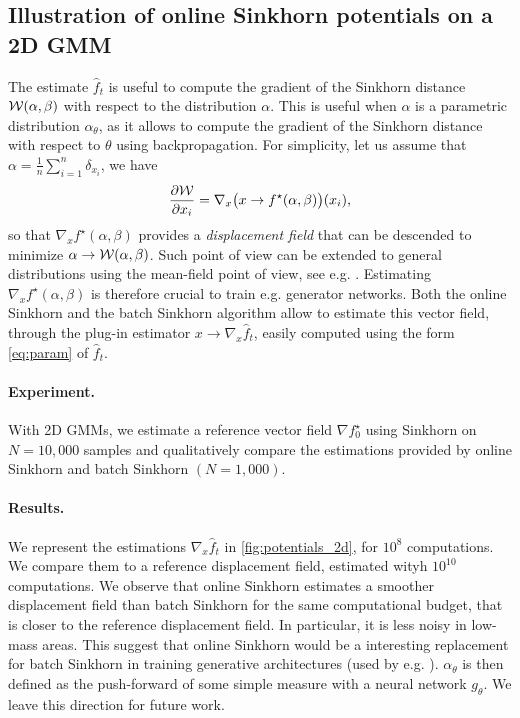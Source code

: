 \subsection{Illustration of online Sinkhorn potentials on a 2D GMM}

The estimate $\hat f_t$ is useful to compute the gradient of the Sinkhorn
distance $\mathcal{W}(\alpha, \beta)$ with respect to the distribution $\alpha$. This is
useful when $\alpha$ is a parametric distribution $\alpha_\theta$, as it allows
to compute the gradient of the Sinkhorn distance with respect to $\theta$ using
backpropagation. For simplicity, let us assume that $\alpha = \frac{1}{n} \sum_{i=1}^n \delta_{x_i}$,
we have
\begin{equation}
    \frac{\partial \mathcal{W}}{\partial x_i} = \nabla_x \big(x \to f^\star(\alpha, \beta)\big) (x_i),
\end{equation}
so that $\nabla_x f^\star(\alpha, \beta)$ provides a \textit{displacement field} that can be
descended to minimize $\alpha \to \mathcal{W}(\alpha, \beta)$. Such point of view can be
extended to general distributions using the mean-field point of view, see e.g.
\cite{santambrogio2015optimal,chizat2019sparse}.
% 
Estimating $\nabla_x f^\star(\alpha, \beta)$ is therefore crucial to train e.g.
generator networks. Both the online Sinkhorn and the batch Sinkhorn algorithm
allow to estimate this vector field, through the plug-in estimator $x \to
\nabla_x \hat f_t$, easily computed using the form \eqref{eq:param} of $\hat
f_t$. 

\paragraph{Experiment.} With 2D GMMs, we estimate a reference vector field
$\nabla f^\star_0$ using Sinkhorn on $N=10,000$ samples and qualitatively
compare the estimations provided by online Sinkhorn and batch Sinkhorn
$(N=1,000)$.

\paragraph{Results.}We represent the estimations $\nabla_x \hat f_t$ in
\autoref{fig:potentials_2d}, for $10^8$ computations. We compare them to a
reference displacement field, estimated wityh $10^10$ computations. We observe
that online Sinkhorn estimates a smoother displacement field than batch Sinkhorn
for the same computational budget, that is closer to the reference displacement
field. In particular, it is less noisy in low-mass areas. This suggest that
online Sinkhorn would be a interesting replacement for batch Sinkhorn in
training generative architectures (used by e.g. \citet{2018-Genevay-aistats}).
$\alpha_\theta$ is then defined as the push-forward of some simple
measure with a neural network $g_\theta$. We leave this direction for future
work.


